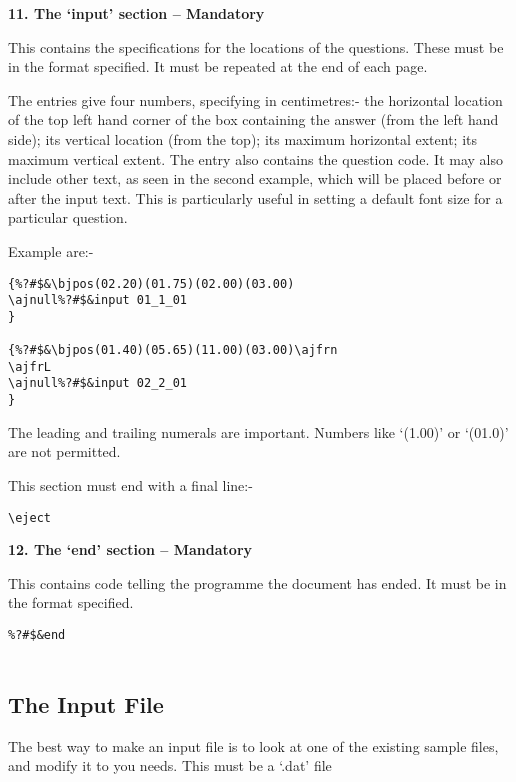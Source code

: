 \vspace*{0.2cm}
{\bf \large 11. The `input' section -- Mandatory}
\vspace*{0.2cm}

This contains the specifications for the locations of the questions. These
must be in the format specified. It must be repeated at the end of each
page. 

The entries give four numbers, specifying in centimetres:- the horizontal
location of the top left hand corner of the box containing the answer (from
the left hand side); its vertical location (from the top); its maximum
horizontal extent; its maximum vertical extent.  The entry also contains
the question code. It may also include other text, as seen in the second
example, which will be placed before or after the input text. This is
particularly useful in setting a default font size for a particular
question. 

Example are:-

\begin{verbatim}
{%?#$&\bjpos(02.20)(01.75)(02.00)(03.00)
\ajnull%?#$&input 01_1_01
}

{%?#$&\bjpos(01.40)(05.65)(11.00)(03.00)\ajfrn
\ajfrL
\ajnull%?#$&input 02_2_01
}
\end{verbatim}

The leading and trailing numerals are important. Numbers like `(1.00)' 
or `(01.0)' are not permitted.

This section must end with a final line:-

\begin{verbatim}
\eject
\end{verbatim}

\vspace*{0.2cm}
{\bf \large 12. The `end' section -- Mandatory}
\vspace*{0.2cm}

This contains code telling the programme the document has ended. It must be
in the format specified. 

\begin{verbatim}
%?#$&end


\end{verbatim}

\subsection{The Input File}

The best way to make an input file is to look at one of the existing sample
files, and modify it to you needs. This must be a `.dat' file 

